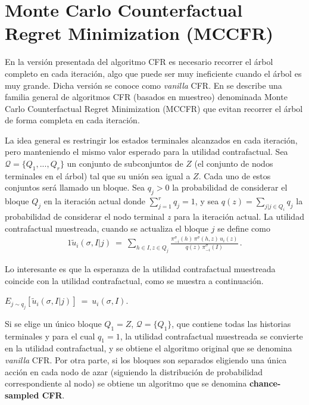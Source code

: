 \section{Monte Carlo Counterfactual Regret Minimization (MCCFR)}

En la versión presentada del algoritmo CFR es necesario recorrer el árbol completo en cada iteración, algo que puede ser muy ineficiente cuando el árbol es muy grande. Dicha versión se conoce como \textit{vanilla} CFR. En \cite{bib:montecarlo-cfr} se describe una familia general de algoritmos CFR (basados en muestreo) denominada Monte Carlo Counterfactual Regret Minimization (MCCFR) que evitan recorrer el árbol de forma completa en cada iteración.

La idea general es restringir los estados terminales alcanzados en cada iteración, pero manteniendo el mismo valor esperado para la utilidad contrafactual. Sea $\mathcal{Q} = \{Q_1,..., Q_r\}$ un conjunto de subconjuntos de $Z$ (el conjunto de nodos terminales en el árbol) tal que su unión sea igual a $Z$. Cada uno de estos conjuntos será llamado un bloque. Sea $q_j > 0$ la probabilidad de considerar el bloque $Q_j$ en la iteración actual donde $\sum_{j = 1}^r {q_j} = 1$, y sea $q(z) = \sum_{j | j \in Q_i} q_j$ la probabilidad de considerar el nodo terminal $z$ para la iteración actual. La utilidad contrafactual muestreada, cuando se actualiza el bloque $j$ se define como
\begin{alignat}{1}
\tilde{u}_i(\sigma, I | j)\ =\ \sum_{h \in I, z \in Q_j} \frac{\pi^\sigma_{-i}(h)\,\pi^\sigma(h, z)\, u_i(z)}{q(z)\,\pi^\sigma_{-i}(I)} \,.
\end{alignat}

Lo interesante es que la esperanza de la utilidad contrafactual muestreada coincide con la utilidad contrafactual, como se muestra a continuación.

\begin{theorem}
\label{theo:esperanza-MCCFR}
$E_{j \sim q_j} [\tilde{u}_i(\sigma, I | j)]\ =\ u_i(\sigma, I)$.
\end{theorem}

Si se elige un único bloque $Q_1=Z$, $\mathcal{Q} = \{Q_1\}$, que contiene todas las historias terminales y para el cual $q_1=1$, la utilidad contrafactual muestreada se convierte en la utilidad contrafactual, y se obtiene el algoritmo original que se denomina \textit{vanilla} CFR. Por otra parte, si los bloques son separados eligiendo una única acción en cada nodo de azar (siguiendo la distribución de probabilidad correspondiente al nodo) se obtiene un algoritmo que se denomina \textbf{chance-sampled CFR}.

